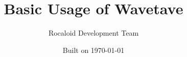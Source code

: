 

\author{Rocaloid Development Team}
\title{Basic Usage of Wavetave}
\date{Built on \today}



\maketitle





